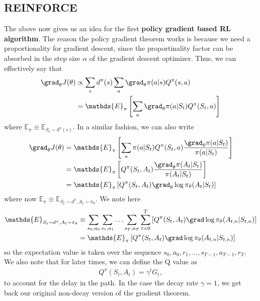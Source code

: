 \subsection{REINFORCE}
The above now gives us an idea for the first \textbf{policy gradient based RL algorithm}. The reason the policy gradient theorem works is because we need a proportionality for gradient descent, since the proportinality factor can be absorbed in the step size $\alpha$ of the gradient descent optimizer. Thus, we can effectively say that 
\begin{align}
    \grad_{\theta} J(\theta) &\propto \sum_{s} d^{\pi}(s) \sum_{a} \grad_{\theta} \pi(a|s) Q^{\pi}(s,a) \\
    &= \mathds{E}_{\pi}\left[\sum_{a} \grad_{\theta} \pi(a|S_t) Q^{\pi}(S_t,a)\right] 
\end{align}
where $\mathds{E}_{\pi} \equiv \mathds{E}_{S_t \sim d^{\pi}(s)}$. In a similar fashion, we can also write 
\begin{align}
    \grad_{\theta} J(\theta)&= \mathds{E}_{\pi}\left[\sum_{a} \pi(a|S_t) Q^{\pi}(S_t,a) \frac{\grad_{\theta} \pi(a|S_t)}{\pi(a|S_t)} \right] \\ 
    &=  \mathds{E}_{\pi}\left[Q^{\pi}(S_t,A_t) \frac{\grad_{\theta} \pi(A_t|S_t)}{\pi(A_t|S_t)} \right] \\
    &=  \mathds{E}_{\pi}\left[Q^{\pi}(S_t,A_t) \grad_{\theta}\log{\pi_\theta(A_t|S_t)} \right]
\end{align}
where now $\mathds{E}_{\pi} \equiv \mathds{E}_{S_t \sim d^{\pi},A_{t}\sim \pi_{\theta}}$. We note here
\begin{align}
    \mathds{E}_{S_t \sim d^{\pi},A_{t}\sim \pi_{\theta}} &\equiv \sum_{s_{0},a_0} \sum_{s_{1},a_1} \ldots \sum_{s_T,a_T} \sum^{T}_{t=0}\left[Q^{\pi}(S_t,A_t) \grad\log{\pi_\theta(A_{t,n}|S_{t,n})}\right] \\
    &= \mathds{E}_{\pi} \left[ Q^{\pi}(S_t,A_t) \grad\log{\pi_\theta(A_{t,n}|S_{t,n})}\right]
\end{align}
so the expectation value is taken over the sequence $s_{0},a_0,r_1,\ldots,s_{T-1},a_{T-1},r_T$. We also note that for later times, we can define the Q value as 
\begin{align}
    Q^{\pi}(S_t,A_t) = \gamma^t G_t,
\end{align}
to account for the delay in the path. In the case the decay rate $\gamma=1$, we get back our original non-decay version of the gradient theorem. 
